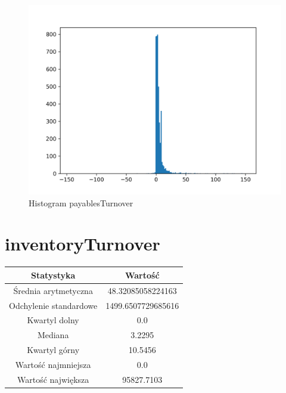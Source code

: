 \documentclass{article}
\begin{document}
\begin{figure}[h!]
    \includegraphics[width=\linewidth]{variables/payablesTurnover.png}
    \caption{Histogram payablesTurnover }
\end{figure}\section{ inventoryTurnover }

\begin{center}
    \begin{tabular}{|c | c|} 
    \hline
    Statystyka & Wartość \\
    \hline\hline
    Średnia arytmetyczna & 48.32085058224163 \\ 
    \hline
    Odchylenie standardowe & 1499.6507729685616 \\
    \hline
    Kwartyl dolny & 0.0 \\
    \hline
    Mediana & 3.2295 \\
    \hline
    Kwartyl górny & 10.5456 \\
    \hline
    Wartość najmniejsza & 0.0 \\
    \hline
    Wartość największa & 95827.7103 \\
    \hline
   \end{tabular}
\end{center}
\end{document}
